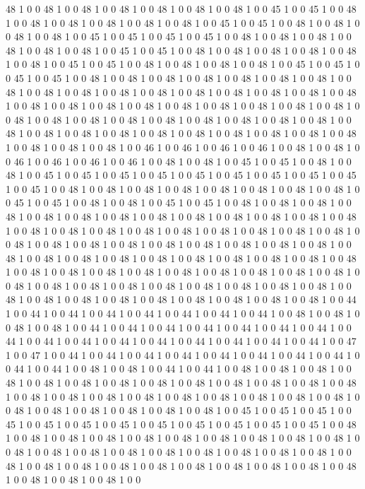 48
1
0
0
48
1
0
0
48
1
0
0
48
1
0
0
48
1
0
0
48
1
0
0
48
1
0
0
45
1
0
0
45
1
0
0
48
1
0
0
48
1
0
0
48
1
0
0
48
1
0
0
48
1
0
0
48
1
0
0
45
1
0
0
45
1
0
0
48
1
0
0
48
1
0
0
48
1
0
0
48
1
0
0
45
1
0
0
45
1
0
0
45
1
0
0
45
1
0
0
48
1
0
0
48
1
0
0
48
1
0
0
48
1
0
0
48
1
0
0
48
1
0
0
45
1
0
0
45
1
0
0
48
1
0
0
48
1
0
0
48
1
0
0
48
1
0
0
48
1
0
0
48
1
0
0
45
1
0
0
45
1
0
0
48
1
0
0
48
1
0
0
48
1
0
0
48
1
0
0
45
1
0
0
45
1
0
0
45
1
0
0
45
1
0
0
48
1
0
0
48
1
0
0
48
1
0
0
48
1
0
0
48
1
0
0
48
1
0
0
48
1
0
0
48
1
0
0
48
1
0
0
48
1
0
0
48
1
0
0
48
1
0
0
48
1
0
0
48
1
0
0
48
1
0
0
48
1
0
0
48
1
0
0
48
1
0
0
48
1
0
0
48
1
0
0
48
1
0
0
48
1
0
0
48
1
0
0
48
1
0
0
48
1
0
0
48
1
0
0
48
1
0
0
48
1
0
0
48
1
0
0
48
1
0
0
48
1
0
0
48
1
0
0
48
1
0
0
48
1
0
0
48
1
0
0
48
1
0
0
48
1
0
0
48
1
0
0
48
1
0
0
48
1
0
0
48
1
0
0
48
1
0
0
48
1
0
0
48
1
0
0
48
1
0
0
48
1
0
0
48
1
0
0
48
1
0
0
46
1
0
0
46
1
0
0
46
1
0
0
46
1
0
0
48
1
0
0
48
1
0
0
46
1
0
0
46
1
0
0
46
1
0
0
46
1
0
0
48
1
0
0
48
1
0
0
45
1
0
0
45
1
0
0
48
1
0
0
48
1
0
0
45
1
0
0
45
1
0
0
45
1
0
0
45
1
0
0
45
1
0
0
45
1
0
0
45
1
0
0
45
1
0
0
45
1
0
0
45
1
0
0
48
1
0
0
48
1
0
0
48
1
0
0
48
1
0
0
48
1
0
0
48
1
0
0
48
1
0
0
48
1
0
0
45
1
0
0
45
1
0
0
48
1
0
0
48
1
0
0
45
1
0
0
45
1
0
0
48
1
0
0
48
1
0
0
48
1
0
0
48
1
0
0
48
1
0
0
48
1
0
0
48
1
0
0
48
1
0
0
48
1
0
0
48
1
0
0
48
1
0
0
48
1
0
0
48
1
0
0
48
1
0
0
48
1
0
0
48
1
0
0
48
1
0
0
48
1
0
0
48
1
0
0
48
1
0
0
48
1
0
0
48
1
0
0
48
1
0
0
48
1
0
0
48
1
0
0
48
1
0
0
48
1
0
0
48
1
0
0
48
1
0
0
48
1
0
0
48
1
0
0
48
1
0
0
48
1
0
0
48
1
0
0
48
1
0
0
48
1
0
0
48
1
0
0
48
1
0
0
48
1
0
0
48
1
0
0
48
1
0
0
48
1
0
0
48
1
0
0
48
1
0
0
48
1
0
0
48
1
0
0
48
1
0
0
48
1
0
0
48
1
0
0
48
1
0
0
48
1
0
0
48
1
0
0
48
1
0
0
48
1
0
0
48
1
0
0
48
1
0
0
48
1
0
0
48
1
0
0
48
1
0
0
48
1
0
0
48
1
0
0
48
1
0
0
48
1
0
0
48
1
0
0
48
1
0
0
48
1
0
0
48
1
0
0
48
1
0
0
44
1
0
0
44
1
0
0
44
1
0
0
44
1
0
0
44
1
0
0
44
1
0
0
44
1
0
0
44
1
0
0
48
1
0
0
48
1
0
0
48
1
0
0
48
1
0
0
44
1
0
0
44
1
0
0
44
1
0
0
44
1
0
0
44
1
0
0
44
1
0
0
44
1
0
0
44
1
0
0
44
1
0
0
44
1
0
0
44
1
0
0
44
1
0
0
44
1
0
0
44
1
0
0
44
1
0
0
44
1
0
0
47
1
0
0
47
1
0
0
44
1
0
0
44
1
0
0
44
1
0
0
44
1
0
0
44
1
0
0
44
1
0
0
44
1
0
0
44
1
0
0
44
1
0
0
44
1
0
0
48
1
0
0
48
1
0
0
44
1
0
0
44
1
0
0
48
1
0
0
48
1
0
0
48
1
0
0
48
1
0
0
48
1
0
0
48
1
0
0
48
1
0
0
48
1
0
0
48
1
0
0
48
1
0
0
48
1
0
0
48
1
0
0
48
1
0
0
48
1
0
0
48
1
0
0
48
1
0
0
48
1
0
0
48
1
0
0
48
1
0
0
48
1
0
0
48
1
0
0
48
1
0
0
48
1
0
0
48
1
0
0
48
1
0
0
48
1
0
0
48
1
0
0
48
1
0
0
45
1
0
0
45
1
0
0
45
1
0
0
45
1
0
0
45
1
0
0
45
1
0
0
45
1
0
0
45
1
0
0
45
1
0
0
45
1
0
0
45
1
0
0
45
1
0
0
48
1
0
0
48
1
0
0
48
1
0
0
48
1
0
0
48
1
0
0
48
1
0
0
48
1
0
0
48
1
0
0
48
1
0
0
48
1
0
0
48
1
0
0
48
1
0
0
48
1
0
0
48
1
0
0
48
1
0
0
48
1
0
0
48
1
0
0
48
1
0
0
48
1
0
0
48
1
0
0
48
1
0
0
48
1
0
0
48
1
0
0
48
1
0
0
48
1
0
0
48
1
0
0
48
1
0
0
48
1
0
0
48
1
0
0
48
1
0
0
48
1
0
0
48
1
0
0
